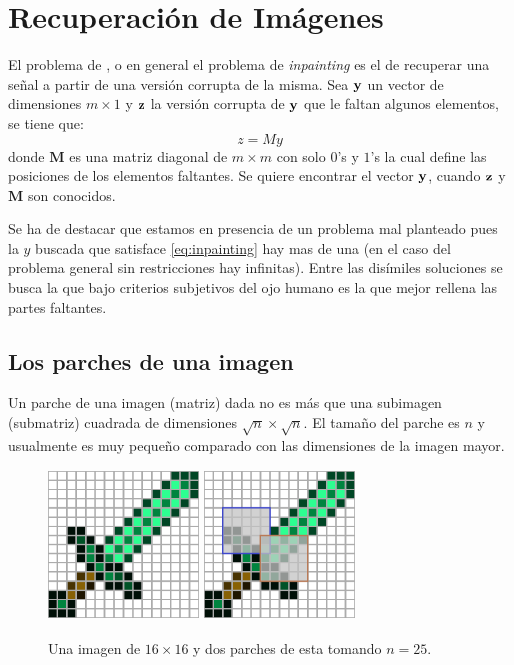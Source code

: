\chapter{Recuperaci\'on de Imágenes}\label{chapter:ImIp} %

\begin{definition}
El problema de \II, o en general el problema de \textit{inpainting} es el de recuperar una señal a partir de una versi\'on corrupta de la misma. Sea $\mathbf{y}$ un vector de dimensiones $m \times 1$ y $\mathbf{z}$ la versi\'on corrupta de $\mathbf{y}$ que le faltan algunos elementos, se tiene que:
\begin{equation}
	z = My
	\label{eq:inpainting}
\end{equation}
donde $\mathbf{M}$ es una matriz diagonal de $m \times m$ con solo $0$'s y $1$'s la cual define las posiciones de los elementos faltantes. Se quiere encontrar el vector $\mathbf{y}$, cuando $\mathbf{z}$ y  $\mathbf{M}$ son conocidos. 
\end{definition}

Se ha de destacar que estamos en presencia de un problema mal planteado pues la $y$ buscada que satisface \ref{eq:inpainting} hay mas de una (en el caso del problema general sin restricciones hay infinitas). Entre las dis\'imiles soluciones se busca la que bajo criterios subjetivos del ojo humano es la que mejor rellena las partes faltantes. 

\section{Los parches de una imagen}

\begin{definition}
	Un parche  de una imagen (matriz) dada no es m\'as que una subimagen (submatriz) cuadrada de dimensiones $\sqrt{n} \times \sqrt{n}$. El tamaño del parche es $n$ y usualmente es muy peque\~no comparado con las dimensiones de la imagen mayor.
\end{definition}

\begin{figure}[h]
	\centering
	\includegraphics[width=4cm, height=4cm]{Graphics/diamon_sword.png}
	\hspace{1cm}
	\includegraphics[width=4cm, height=4cm]{Graphics/diamon_sword_with_patches.png}
	\caption{Una imagen de $16 \times 16$ y dos parches de esta tomando $n = 25$.}
\end{figure}

